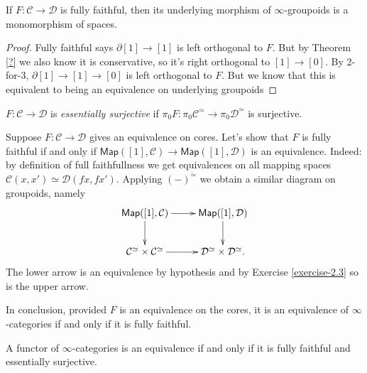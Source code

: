 \begin{lemma}
\label{lemma-full-faithful-implies-underlying-groupoid-map-is-monomorphism}
If $F: \mathcal{C} \to \mathcal{D}$ is fully faithful,
then its underlying morphism of $\infty$-groupoids is a monomorphism
of spaces.
\end{lemma}

\begin{proof}
Fully faithful says $\partial[1] \to [1]$ is 
left orthogonal to $F$. But by Theorem \ref{?}
we also know it is conservative, so it's right orthogonal
to $[1] \to [0]$. By 2-for-3, $\partial[1] \to [1] \to [0]$ 
is left orthogonal to $F$. But we know that this is equivalent
to being an equivalence on underlying groupoids
\end{proof}

\begin{definition}
\label{definition-essentially-surjective}
$F:\mathcal{C} \to \mathcal{D}$ is {\it essentially surjective} if
$\pi_0F: \pi_0\mathcal{C}^\simeq \to \pi_0\mathcal{D}^\simeq$ is surjective.
\end{definition}

\begin{remark}
\label{remark-equivalence-on-cores-implies-fully-faithful-equivalence}
Suppose $F:\mathcal{C} \to \mathcal{D}$ gives an equivalence
on cores. Let's show that $F$ is fully faithful
if and only if $\mathsf{Map}([1],\mathcal{C}) \to \mathsf{Map}([1],\mathcal{D})$ 
is an equivalence. Indeed: by definition of full faithfullness
we get equivalences on all mapping spaces 
$\mathcal{C}(x,x') \simeq \mathcal{D}(fx,fx')$.
Applying $(-)^\simeq$ we obtain a similar diagram on groupoids,
namely
$$
\xymatrix{
\mathsf{Map}([1],\mathcal{C})\ar[r]\ar[d]&
\mathsf{Map}([1],\mathcal{D})\ar[d]\\
\mathcal{C}^\simeq \times \mathcal{C}^\simeq\ar[r]&
\mathcal{D}^\simeq\times \mathcal{D}^\simeq.
}
$$
The lower arrow is an equivalence by hypothesis
and by Exercise \ref{exercise-2.3} so is the upper arrow.

In conclusion, provided $F$ is an equivalence on the cores,
it is an equivalence of $\infty$-categories if and only if it
is fully faithful. 
\end{remark}

\begin{lemma}
\label{lemma-equivalence-iff-fully-faithful-and-essentially-surjective}
A functor of $\infty$-categories is an equivalence
if and only if it is fully faithful and essentially surjective.
\end{lemma}


